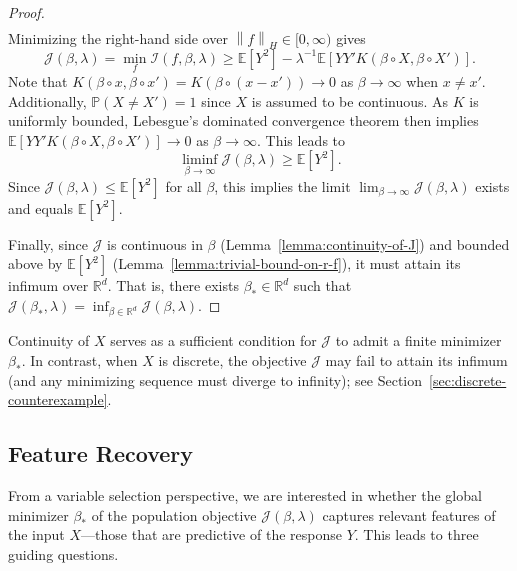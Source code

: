 \documentclass[sn-mathphys-num]{sn-jnl}%
\numberwithin{equation}{section}
\newcommand{\R}{\mathbb{R}}
\newcommand{\E}{\mathbb{E}}
\newcommand{\kernel}{K}
\newcommand{\norm}[1]{\left\|{#1}\right\|} %
\renewcommand{\P}{\mathbb{P}}
\newtheorem{assumption}{Assumption}[section]
\theoremstyle{thmstyleone}%
\theoremstyle{thmstyletwo}%
\theoremstyle{thmstylethree}%
\begin{document}
\begin{proof}
\begin{equation*}
\begin{split}
\end{split} 
\end{equation*} 
Minimizing the right-hand side over $\norm{f}_H \in [0, \infty)$ gives 
\begin{equation*}
	\mathcal{J} (\beta, \lambda) = \min_{f} \mathcal{I}(f, \beta, \lambda) 
		\ge \E[Y^2] - \lambda^{-1} \E[YY'\kernel(\beta \circ X, \beta \circ X')].
\end{equation*} 
Note that $\kernel(\beta \circ x, \beta \circ x') = \kernel(\beta \circ (x-x')) \to 0$ as $\beta \to \infty$ when $x \ne x'$. 
Additionally, $\P(X \ne X') = 1$ since $X$ is assumed to be continuous. As $\kernel$ is uniformly bounded,  Lebesgue’s dominated convergence theorem then implies $\E[YY'\kernel(\beta \circ X, \beta \circ X')] \to 0$ as $\beta \to \infty$. This leads to 
\[
	\liminf_{\beta \to \infty} \mathcal{J}(\beta, \lambda) \ge \E[Y^2].
\]
Since $\mathcal{J}(\beta, \lambda) \le \E[Y^2]$ for all $\beta$, this implies the limit 
$\lim_{\beta \to \infty} \mathcal{J}(\beta, \lambda) $ exists and equals $\E[Y^2]$.

Finally, since $\mathcal{J}$ is continuous in $\beta$ (Lemma~\ref{lemma:continuity-of-J}) and bounded above by $\E[Y^2]$ (Lemma~\ref{lemma:trivial-bound-on-r-f}), it must attain its infimum over $\R^d$. That is, there exists $\beta_* \in \R^d$ such that
$
	\mathcal{J}(\beta_*, \lambda) = \inf_{\beta \in \R^d} \mathcal{J}(\beta, \lambda)$. 
\end{proof} 

Continuity of $X$ serves as a sufficient condition for $\mathcal{J}$ to admit a finite minimizer $\beta_*$. In contrast, when $X$ is discrete, the objective $\mathcal{J}$ may fail to attain its infimum (and any minimizing sequence must diverge to infinity); see Section~\ref{sec:discrete-counterexample}.


\subsection{Feature Recovery} 


From a variable selection perspective, we are interested in whether the global minimizer $\beta_*$ of the population objective $\mathcal{J}(\beta, \lambda)$ captures relevant features of the input $X$---those that are predictive of the response $Y$. This leads to three guiding questions.
\end{document}
